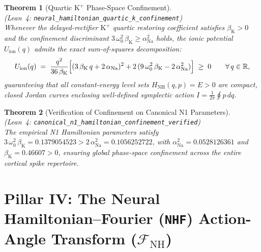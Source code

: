 \documentclass[11pt,letterpaper]{article}
\newcommand{\lean}[1]{\nolinkurl{#1}}
\newtheorem{theorem}{Theorem}[section]
\theoremstyle{definition}
\begin{document}
\begin{theorem}[Quartic $\mathrm{K}^+$ Phase-Space Confinement]
\label{thm:t8}
~\\
(\emph{Lean~4:} \lean{neural_hamiltonian_quartic_k_confinement})\\
Whenever the delayed-rectifier $\mathrm{K}^+$ quartic restoring coefficient satisfies $\beta_{\mathrm{K}} > 0$ and the confinement discriminant $3\,\omega_0^2\,\beta_{\mathrm{K}} \ge \alpha_{\mathrm{Na}}^2$ holds, the ionic potential $U_{\mathrm{ion}}(q)$ admits the exact sum-of-squares decomposition:
\begin{equation}
\label{eq:t8_sos}
U_{\mathrm{ion}}(q) \;=\; \frac{q^2}{36\,\beta_{\mathrm{K}}}\Bigl[(3\,\beta_{\mathrm{K}}\,q + 2\,\alpha_{\mathrm{Na}})^2 + 2\,(9\,\omega_0^2\,\beta_{\mathrm{K}} - 2\,\alpha_{\mathrm{Na}}^2)\Bigr] \;\ge\; 0
\qquad \forall\,q \in \mathbb{R},
\end{equation}
guaranteeing that all constant-energy level sets $H_{\mathrm{NH}}(q,p) = E > 0$ are compact, closed Jordan curves enclosing well-defined symplectic action $I = \frac{1}{2\pi}\oint p\,dq$.
\end{theorem}

\begin{theorem}[Verification of Confinement on Canonical N1 Parameters]
\label{thm:t9}
~\\
(\emph{Lean~4:} \lean{canonical_n1_hamiltonian_confinement_verified})\\
The empirical N1 Hamiltonian parameters satisfy $3\,\omega_0^2\,\beta_{\mathrm{K}} = 0.1379054523 > 2\,\alpha_{\mathrm{Na}}^2 = 0.1056252722$, with $\alpha_{\mathrm{Na}}^2 = 0.0528126361$ and $\beta_{\mathrm{K}} = 0.46607 > 0$, ensuring global phase-space confinement across the entire cortical spike repertoire.
\end{theorem}

\section[Pillar IV: Neural Hamiltonian--Fourier (NHF) Transform]{Pillar IV: The Neural Hamiltonian--Fourier (\texttt{NHF}) Action-Angle Transform ($\mathcal{F}_{\mathrm{NH}}$)}
\end{document}
